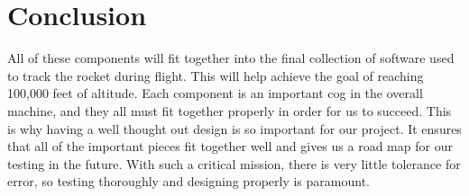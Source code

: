 \documentclass[onecolumn, draftclsnofoot,10pt, compsoc]{IEEEtran}
\begin{document}
\section {Conclusion}
All of these components will fit together into the final collection of
software used to track the rocket during flight.
This will help achieve the goal of reaching 100,000 feet of altitude.
Each component is an important cog in the overall machine, and they
all must fit together properly in order for us to succeed.
This is why having a well thought out design is so important for our project.
It ensures that all of the important pieces fit together well and
gives us a road map for our testing in the future.
With such a critical mission, there is very little tolerance for
error, so testing thoroughly and designing properly is paramount.



\end{document}
